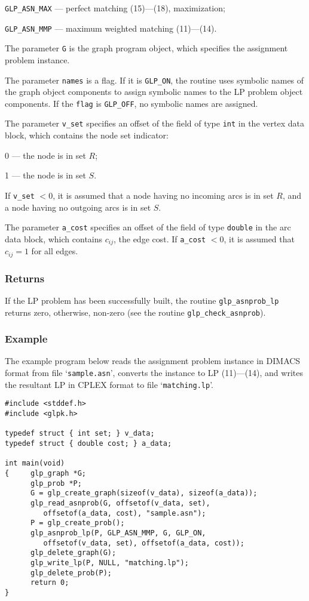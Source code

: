 \verb|GLP_ASN_MAX| --- perfect matching (15)---(18), maximization;

\verb|GLP_ASN_MMP| --- maximum weighted matching (11)---(14).

The parameter \verb|G| is the graph program object, which specifies the
assignment problem instance.

The parameter \verb|names| is a flag. If it is \verb|GLP_ON|, the
routine uses symbolic names of the graph object components to assign
symbolic names to the LP problem object components. If the \verb|flag|
is \verb|GLP_OFF|, no symbolic names are assigned.

The parameter \verb|v_set| specifies an offset of the field of type
\verb|int| in the vertex data block, which contains the node set
indicator:

0 --- the node is in set $R$;

1 --- the node is in set $S$.

\noindent
If \verb|v_set| $<0$, it is assumed that a node having no incoming arcs
is in set $R$, and a node having no outgoing arcs is in set $S$.

The parameter \verb|a_cost| specifies an offset of the field of type
\verb|double| in the arc data block, which contains $c_{ij}$, the edge
cost. If \verb|a_cost| $<0$, it is assumed that $c_{ij}=1$ for all
edges.

\subsubsection*{Returns}

If the LP problem has been successfully built, the routine
\verb|glp_asnprob_lp| returns zero, otherwise, non-zero (see the
routine \verb|glp_check_asnprob|).

\subsubsection*{Example}

The example program below reads the assignment problem instance in
DIMACS format from file `\verb|sample.asn|', converts the instance to
LP (11)---(14), and writes the resultant LP in CPLEX format to file
`\verb|matching.lp|'.

\begin{footnotesize}
\begin{verbatim}
#include <stddef.h>
#include <glpk.h>

typedef struct { int set; } v_data;
typedef struct { double cost; } a_data;

int main(void)
{     glp_graph *G;
      glp_prob *P;
      G = glp_create_graph(sizeof(v_data), sizeof(a_data));
      glp_read_asnprob(G, offsetof(v_data, set),
         offsetof(a_data, cost), "sample.asn");
      P = glp_create_prob();
      glp_asnprob_lp(P, GLP_ASN_MMP, G, GLP_ON,
         offsetof(v_data, set), offsetof(a_data, cost));
      glp_delete_graph(G);
      glp_write_lp(P, NULL, "matching.lp");
      glp_delete_prob(P);
      return 0;
}
\end{verbatim}
\end{footnotesize}

